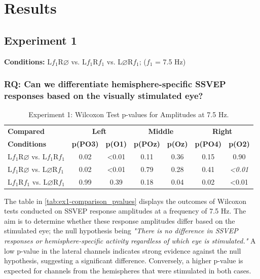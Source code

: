 \chapter{Results}
\label{cha:results}



\section{Experiment 1}
\textbf{Conditions:} L$f_{1}$R$\varnothing$ vs. L$f_{1}$R$f_{1}$ vs. L$\varnothing$R$f_{1}$; ($f_{1}$ = 7.5 Hz)\\ 

\subsection{RQ: Can we differentiate hemisphere-specific SSVEP responses based on the visually stimulated eye?}

\begin{table}[b]
\centering
\begin{tabularx}{\linewidth}{l *{6}{c}}
    \toprule
    \textbf{Compared} & \multicolumn{2}{c}{\textbf{Left}} & \multicolumn{2}{c}{\textbf{Middle}} & \multicolumn{2}{c}{\textbf{Right}} \\
    \textbf{Conditions} & \textbf{p(PO3)} & \textbf{p(O1)} & \textbf{p(POz)} & \textbf{p(Oz)} & \textbf{p(PO4)} & \textbf{p(O2)} \\
    \midrule
    L$f_{1}$R$\varnothing$ vs. L$f_{1}$R$f_{1}$ & 0.02 & <0.01 & 0.11 & 0.36 & 0.15 & 0.90 \\
    L$f_{1}$R$\varnothing$ vs. L$\varnothing$R$f_{1}$  & 0.02 & <0.01 & 0.79 & 0.28 & 0.41 & \textit{<0.01} \\
    L$f_{1}$R$f_{1}$ vs. L$\varnothing$R$f_{1}$ & 0.99 & 0.39 & 0.18 & 0.04 & 0.02 & <0.01 \\
    \bottomrule
\end{tabularx}
\caption{Experiment 1: Wilcoxon Test p-values for Amplitudes at 7.5 Hz.}
\label{tab:ex1-comparison_pvalues}
\end{table}


The table in \autoref{tab:ex1-comparison_pvalues} displays the outcomes of Wilcoxon tests conducted on SSVEP response amplitudes at a frequency of 7.5 Hz. The aim is to determine whether these response amplitudes differ based on the stimulated eye; the null hypothesis being \textit{"There is no difference in SSVEP responses or hemisphere-specific activity regardless of which eye is stimulated."} A low p-value in the lateral channels indicates strong evidence against the null hypothesis, suggesting a significant difference. Conversely, a higher p-value is expected for channels from the hemispheres that were stimulated in both cases.


